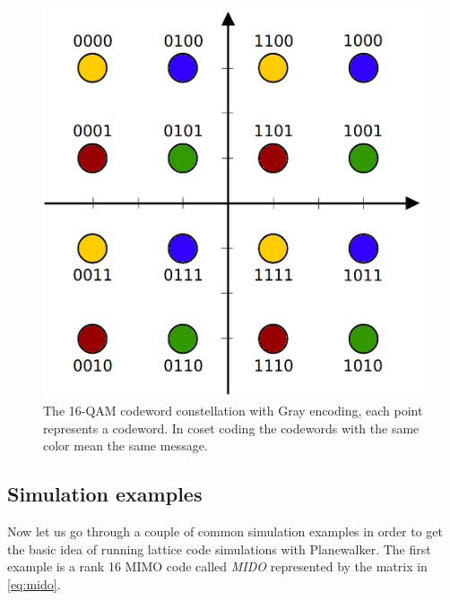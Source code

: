 \documentclass[english,12pt,a4paper,pdftex,sci,utf8]{aaltothesis}
\begin{document}
\par 
\begin{figure}[htb]
  \centering
  \includegraphics[width=0.5\linewidth]{16-QAM}
  \caption{The 16-QAM codeword constellation with Gray encoding, each point represents a codeword. In coset coding the codewords with the same color mean the same message.}
  \label{fig:16QAM}
\end{figure}


\subsection{Simulation examples}

Now let us go through a couple of common simulation examples in order to get the basic idea of running lattice code simulations with Planewalker. The first example is a rank 16 MIMO code called \emph{MIDO} represented by the matrix in \eqref{eq:mido}.
\end{document}
